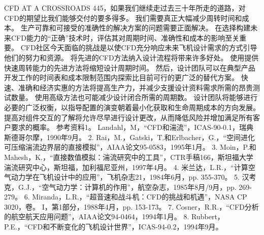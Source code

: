 \documentclass[UTF8,11pt,a4paper,openany,fontset=fandol]{ctexbook}
\begin{document}
CFD AT A CROSSROADS 445，如果我们继续走过去三十年所走的道路，对CFD的期望比我们能够交付的要多得多。 我们需要真正大幅减少周转时间和成本。 生产可靠和可接受的准确性的解决方案的问题需要正面解决。 在选择构建未来CFD能力的“正确”技术时，评估其对周期时间、准确性和成本的影响至关重要。 CFD社区今天面临的挑战是以使CFD充分响应未来飞机设计需求的方式引导他们的努力和资源。 将先进的CFD方法纳入设计流程将带来许多好处。 使用提供快速周转能力的先进方法将缩短设计周期时间。 然后，设计团队可以在典型产品开发工作的时间表和成本限制范围内探索比目前可行的更广泛的替代方案。 快速、准确和经济实惠的方法将提高生产力，并减少支援设计资料需求所需的昂贵测试数量。 使用高级方法也可能减少设计闭合所需的周期数。 设计团队将能够进行必要的广泛权衡，以指导配置的演变朝着最小化获取和生命周期成本的方向发展。 提高对组件交互的了解将允许尽早进行设计更改，从而降低风险并增加满足所有客户要求的概率。 参考资料1。 Landahl，M，“CFD和湍流”，ICAS-90-0.1，瑞典斯德哥尔摩，1990年9月。 2. Rai，M.，Gatski，T.和Erlbacher，G.，“空间进化可压缩湍流边界层的直接模拟”，AIAA论文95-0583，1995年1月。 3. Moin，P.和Mahesh，K.，“直接数值模拟：湍流研究中的工具”，CTR手稿166，斯坦福大学湍流研究中心，斯坦福，加利福尼亚州，1997年4月。 4. 米兰达，L.R.，“计算空气动力学在飞机设计中的应用”，飞机杂志21，1984年6月，pp. 355-370。 5. 汉考克，G.J.，“空气动力学：计算机的作用”，航空杂志，1985年8月/9月，pp. 269-279。 6. Miranda，L.R.，“超音速和战斗机：CFD的挑战和机遇”，NASA CP 3020，卷。 I，第1部分，1988年4月，pp. 153-173。 7. Cosner，R.R.，“CFD分析的航空航天应用问题”，AIAA论文94-0464，1994年1月。 8. Rubbert，P.E.，“CFD和不断变化的飞机设计世界”，ICAS-94-0.2，1994年9月。
\end{document}
